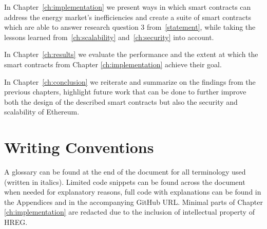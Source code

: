 In Chapter~\ref{ch:implementation} we present ways in which smart contracts can address the energy market's inefficiencies and create a suite of smart contracts which are able to answer research question 3 from~\ref{statement}, while taking the lessons learned from~\ref{ch:scalability} and~\ref{ch:security} into account.

In Chapter~\ref{ch:results} we evaluate the performance and the extent at which the smart contracts from Chapter \ref{ch:implementation} achieve their goal. 

In Chapter~\ref{ch:conclusion} we reiterate and summarize on the findings from the previous chapters, highlight future work that can be done to further improve both the design of the described smart contracts but also the security and scalability of Ethereum.

\section{Writing Conventions}
A glossary can be found at the end of the document for all terminology used (written in italics). Limited code snippets can be found across the document when needed for explanatory reasons, full code with explanations can be found in the Appendices and in the accompanying GitHub URL\@. Minimal parts of Chapter \ref{ch:implementation} are redacted due to the inclusion of intellectual property of HREG.